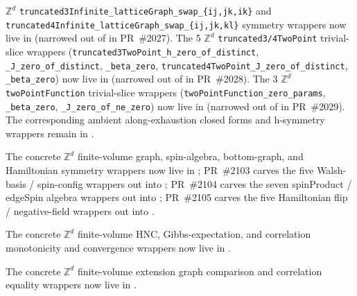 \documentclass[a4paper,11pt]{article}
\begin{document}
{$\mathbb{Z}^d$ \texttt{truncated3Infinite\_latticeGraph\_swap\_\{ij,jk,ik\}}
and \texttt{truncated4Infinite\_latticeGraph\_swap\_\{ij,jk,kl\}}
symmetry wrappers now live in
(narrowed out of  in PR~\#2027). The 5
$\mathbb{Z}^d$ \texttt{truncated3/4TwoPoint} trivial-slice wrappers
(\texttt{truncated3TwoPoint\_h\_zero\_of\_distinct},
\texttt{\_J\_zero\_of\_distinct}, \texttt{\_beta\_zero},
\texttt{truncated4TwoPoint\_J\_zero\_of\_distinct}, \texttt{\_beta\_zero})
now live in
(narrowed out of  in PR~\#2028). The 3
$\mathbb{Z}^d$ \texttt{twoPointFunction} trivial-slice wrappers
(\texttt{twoPointFunction\_zero\_params}, \texttt{\_beta\_zero},
\texttt{\_J\_zero\_of\_ne\_zero}) now live in
(narrowed out of  in PR~\#2029).
The corresponding ambient along-exhaustion closed forms and h-symmetry wrappers
remain in .
\par}

{\raggedright
The concrete $\mathbb{Z}^d$ finite-volume graph, spin-algebra, bottom-graph,
and Hamiltonian symmetry wrappers now live in
;
PR~\#2103 carves the five Walsh-basis / spin-config wrappers out into
;
PR~\#2104 carves the seven spinProduct / edgeSpin algebra wrappers
out into
;
PR~\#2105 carves the five Hamiltonian flip / negative-field
wrappers out into
.
\par}

{\raggedright
The concrete $\mathbb{Z}^d$ finite-volume HNC, Gibbs-expectation, and
correlation monotonicity and convergence wrappers now live in
.
\par}

{\raggedright
The concrete $\mathbb{Z}^d$ finite-volume extension graph comparison and
correlation equality wrappers now live in
.
\par}
\end{document}
